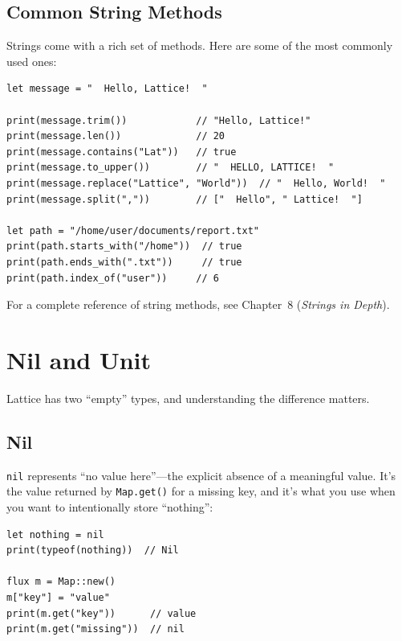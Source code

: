 \subsection{Common String Methods}\label{subsec:string-methods}

Strings come with a rich set of methods.
Here are some of the most commonly used ones:

\begin{lstlisting}[language=Lattice, caption={String methods}]
let message = "  Hello, Lattice!  "

print(message.trim())            // "Hello, Lattice!"
print(message.len())             // 20
print(message.contains("Lat"))   // true
print(message.to_upper())        // "  HELLO, LATTICE!  "
print(message.replace("Lattice", "World"))  // "  Hello, World!  "
print(message.split(","))        // ["  Hello", " Lattice!  "]

let path = "/home/user/documents/report.txt"
print(path.starts_with("/home"))  // true
print(path.ends_with(".txt"))     // true
print(path.index_of("user"))     // 6
\end{lstlisting}

For a complete reference of string methods, see Chapter~8 (\emph{Strings in Depth}).

\section{Nil and Unit}\label{sec:nil-unit}

Lattice has two ``empty'' types, and understanding the difference matters.

\subsection{Nil}\label{subsec:nil}

\lstinline|nil| represents ``no value here''---the explicit absence of a meaningful value.
It's the value returned by \lstinline|Map.get()| for a missing key, and it's what you use when you want to intentionally store ``nothing'':

\begin{lstlisting}[language=Lattice, caption={Nil basics}]
let nothing = nil
print(typeof(nothing))  // Nil

flux m = Map::new()
m["key"] = "value"
print(m.get("key"))      // value
print(m.get("missing"))  // nil
\end{lstlisting}

